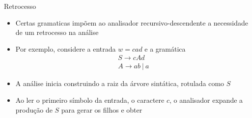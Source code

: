 \begin{frame}[fragile]{Retrocesso}

    \begin{itemize}
        \item Certas gramaticas impõem ao analisador recursivo-descendente a necessidade de um retrocesso na análise

        \item Por exemplo, considere a entrada $w = cad$ e a gramática
        \[
            \begin{array}{l}
                S \to cAd \\
                A \to ab\ |\ a
            \end{array}
        \]

        \item A análise inicia construindo a raiz da árvore sintática, rotulada como $S$

        \item Ao ler o primeiro símbolo da entrada, o caractere $c$, o analisador expande a produção de $S$ para gerar os filhos e obter
        \begin{center}
        \end{center}
        
    \end{itemize}

\end{frame}

